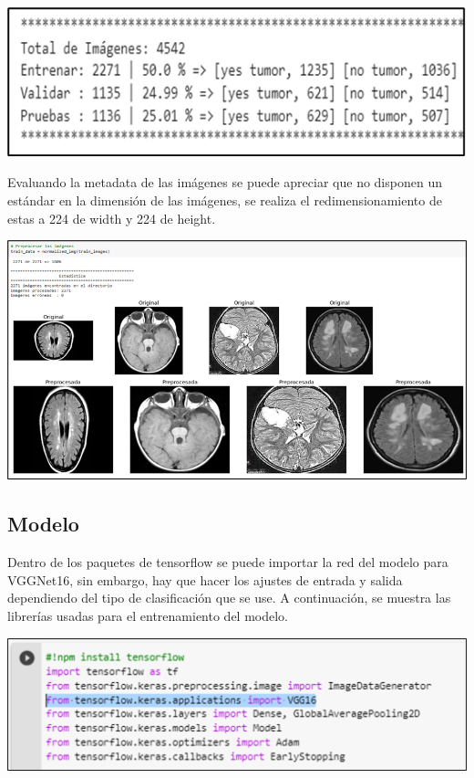\documentclass[12pt,twoside,titlepage]{ingenius}
\newenvironment{figura}
  {\par\bigskip\noindent\minipage{\linewidth}}
  {\endminipage\par\bigskip}
\begin{document}
\begin{multicols}{2}
\begin{figura}%
	\centering
	\includegraphics[scale=0.52]{figuras/fig1.png}
	\label{figura1}
\end{figura}

Evaluando la metadata de las imágenes se puede apreciar que no disponen un estándar en la dimensión de las imágenes, se realiza el redimensionamiento de estas a 224 de width y 224 de height.

\begin{figura}%
	\centering
	\includegraphics[scale=0.3]{figuras/fig2.png}
	\label{figura2}
\end{figura}

\subsection{Modelo}
Dentro de los paquetes de tensorflow se puede importar la red del modelo para VGGNet16, sin embargo, hay que hacer los ajustes de entrada y salida dependiendo del tipo de clasificación que se use. 
A continuación, se muestra las librerías usadas para el entrenamiento del modelo.

\begin{figura}%
	\centering
	\includegraphics[scale=0.24]{figuras/fig3.png}
	\label{figura3}
\end{figura}


\end{multicols}
\end{document}

